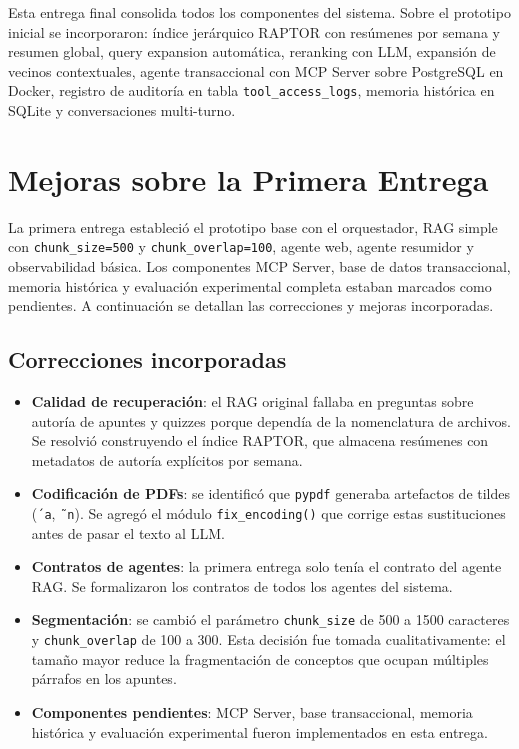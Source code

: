 \documentclass[conference]{IEEEtran}
\begin{document}
Esta entrega final consolida todos los componentes del sistema. Sobre el prototipo inicial se incorporaron: índice jerárquico RAPTOR con resúmenes por semana y resumen global, query expansion automática, reranking con LLM, expansión de vecinos contextuales, agente transaccional con MCP Server sobre PostgreSQL en Docker, registro de auditoría en tabla \texttt{tool\_access\_logs}, memoria histórica en SQLite y conversaciones multi-turno.

\section{Mejoras sobre la Primera Entrega}

La primera entrega estableció el prototipo base con el orquestador, RAG simple con \texttt{chunk\_size=500} y \texttt{chunk\_overlap=100}, agente web, agente resumidor y observabilidad básica. Los componentes MCP Server, base de datos transaccional, memoria histórica y evaluación experimental completa estaban marcados como pendientes. A continuación se detallan las correcciones y mejoras incorporadas.

\subsection{Correcciones incorporadas}

\begin{itemize}
    \item \textbf{Calidad de recuperación}: el RAG original fallaba en preguntas sobre autoría de apuntes y quizzes porque dependía de la nomenclatura de archivos. Se resolvió construyendo el índice RAPTOR, que almacena resúmenes con metadatos de autoría explícitos por semana.
    \item \textbf{Codificación de PDFs}: se identificó que \texttt{pypdf} generaba artefactos de tildes (\texttt{´a}, \texttt{˜n}). Se agregó el módulo \texttt{fix\_encoding()} que corrige estas sustituciones antes de pasar el texto al LLM.
    \item \textbf{Contratos de agentes}: la primera entrega solo tenía el contrato del agente RAG. Se formalizaron los contratos de todos los agentes del sistema.
    \item \textbf{Segmentación}: se cambió el parámetro \texttt{chunk\_size} de 500 a 1500 caracteres y \texttt{chunk\_overlap} de 100 a 300. Esta decisión fue tomada cualitativamente: el tamaño mayor reduce la fragmentación de conceptos que ocupan múltiples párrafos en los apuntes.
    \item \textbf{Componentes pendientes}: MCP Server, base transaccional, memoria histórica y evaluación experimental fueron implementados en esta entrega.
\end{itemize}
\end{document}
